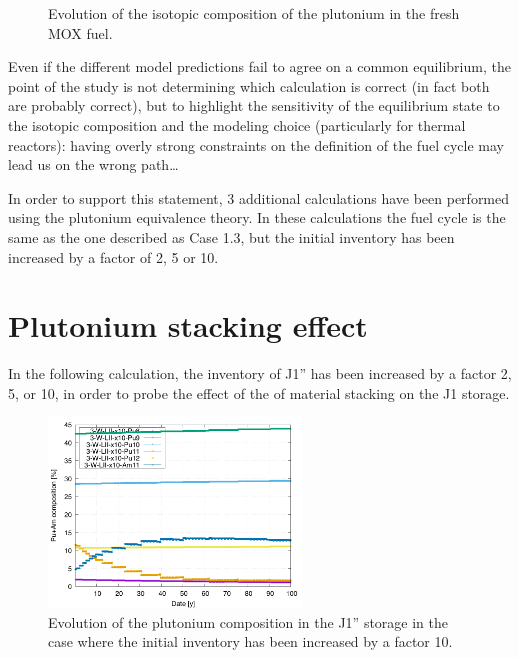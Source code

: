 \documentclass[12pt]{article}
\begin{document}
\begin{figure}[h!]
  \centering
  

  \caption{ Evolution of the isotopic composition of the plutonium in the fresh MOX fuel.
    \label{fig:pu_compo} } 
  \end{figure}

Even if the different model predictions fail to agree on a common equilibrium,
the point of the study is not determining which calculation is correct (in fact both are probably correct), but to highlight the sensitivity of the equilibrium
state to the isotopic composition and the modeling choice (particularly for
thermal reactors): having overly strong constraints on the definition of the fuel
cycle may lead us on the wrong path\dots


In order to support this statement, 3 additional calculations have been performed
using the plutonium equivalence theory. In these calculations the fuel cycle is
the same as the one described as Case 1.3, but the initial inventory has been
increased by a factor of 2, 5 or 10.


\section{Plutonium stacking effect}

In the following calculation, the inventory of J1'' has been increased by a
factor 2, 5, or 10, in order to probe the effect of the of material stacking on
the J1 storage.

\begin{figure}[h!]
  \centering
  \includegraphics[width=0.6\textwidth]  {img/C_1_3_W_LII_x10_pu_composition}
  \caption{Evolution of the plutonium composition in the J1'' storage in the
  case where the initial inventory has been increased by a factor 10.}
  \label{fig:LII_compo_x10}
\end{figure}
\end{document}

